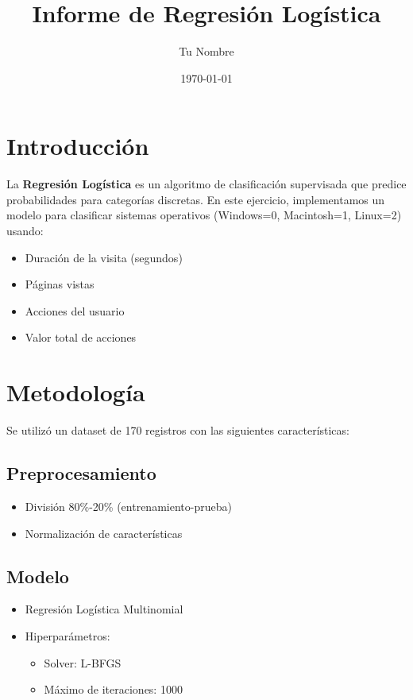 \documentclass{article}
\title{Informe de Regresión Logística}
\author{Tu Nombre}
\date{\today}
\begin{document}
\maketitle

\section{Introducción}
La \textbf{Regresión Logística} es un algoritmo de clasificación supervisada que predice probabilidades para categorías discretas. En este ejercicio, implementamos un modelo para clasificar sistemas operativos (Windows=0, Macintosh=1, Linux=2) usando:

\begin{itemize}
    \item Duración de la visita (segundos)
    \item Páginas vistas
    \item Acciones del usuario
    \item Valor total de acciones
\end{itemize}

\section{Metodología}
Se utilizó un dataset de 170 registros con las siguientes características:

\subsection{Preprocesamiento}
\begin{itemize}
    \item División 80\%-20\% (entrenamiento-prueba)
    \item Normalización de características
\end{itemize}

\subsection{Modelo}
\begin{itemize}
    \item Regresión Logística Multinomial
    \item Hiperparámetros:
    \begin{itemize}
        \item Solver: L-BFGS
        \item Máximo de iteraciones: 1000
    \end{itemize}
\end{itemize}
\end{document}
